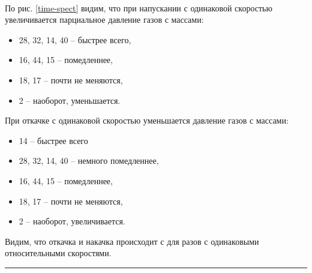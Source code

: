 \documentclass[a4paper,12pt]{article} %
\begin{document}
\paragraph{} По рис. \ref{time-spect} видим, что при напускании с одинаковой скоростью увеличивается парциальное давление газов с массами:
\begin{itemize}
\renewcommand{\labelitemi}{$m_0 = $}
\itemsep0em
\item 28, 32, 14, 40 -- быстрее всего,
\item 16, 44, 15 -- помедленнее,
\item 18, 17 -- почти не меняются,
\item 2 -- наоборот, уменьшается.
\end{itemize}

При откачке с одинаковой скоростью уменьшается давление газов с массами:

\begin{itemize}
\renewcommand{\labelitemi}{$m_0 = $}
\itemsep0em
\item 14 -- быстрее всего
\item 28, 32, 14, 40 -- немного помедленнее,
\item 16, 44, 15 -- помедленнее,
\item 18, 17 -- почти не меняются,
\item 2 -- наоборот, увеличивается.
\end{itemize}

Видим, что откачка и накачка происходит с для разов с одинаковыми относительными скоростями.

\medskip\hrule\medskip
\end{document}
